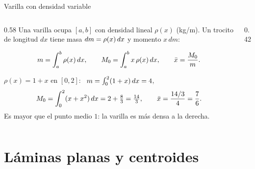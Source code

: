 \documentclass[10pt,aspectratio=169]{beamer}
\begin{document}
\begin{frame}{Varilla con densidad variable}
  \begin{columns}
    \begin{column}{0.58\textwidth}
      Una varilla ocupa $[a,b]$ con densidad lineal $\rho(x)$ (kg/m). Un trocito de longitud $dx$ tiene masa
      $dm=\rho(x)\,dx$ y momento $x\,dm$:
      \begin{definicion}
        \[ m=\int_a^b\rho(x)\,dx,\qquad M_0=\int_a^bx\,\rho(x)\,dx,\qquad \bar x=\frac{M_0}{m}. \]
      \end{definicion}
      \begin{ejemplo}[2]
        $\rho(x)=1+x$ en $[0,2]$: \ $m=\int_0^2(1+x)\,dx=4$,
        \[ M_0=\int_0^2(x+x^2)\,dx=2+\tfrac83=\tfrac{14}3,\qquad \bar x=\frac{14/3}{4}=\frac76. \]
        Es mayor que el punto medio $1$: la varilla es más densa a la derecha.
      \end{ejemplo}
    \end{column}
    \begin{column}{0.42\textwidth}
      \centering
    \end{column}
  \end{columns}
\end{frame}

\section{Láminas planas y centroides}
\end{document}
